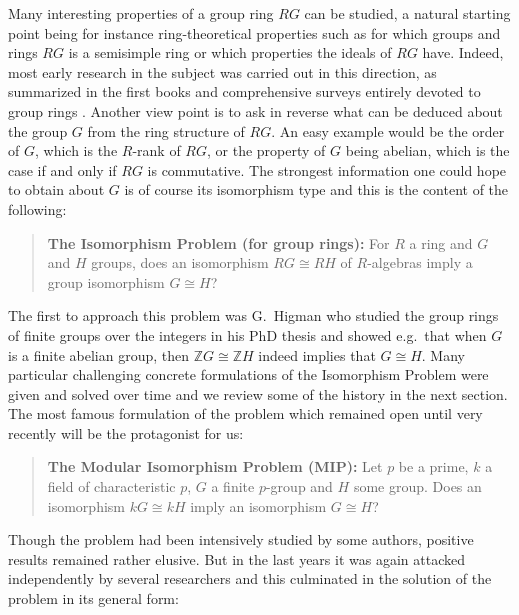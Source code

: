 \documentclass[11pt, a4paper]{amsart}
\theoremstyle{definition}
\begin{document}
Many interesting properties of a group ring $RG$ can be studied, a natural starting point being for instance ring-theoretical properties such as for which groups and rings $RG$ is a semisimple ring or which properties the ideals of $RG$ have. Indeed, most early research in the subject was carried out in this direction, as summarized in the first books and comprehensive surveys entirely devoted to group rings \cite{PassmanInfiniteGroupRings, ZalesskiiMihalev73, BovdiBook74, PassmanAlgebraicStructure}. Another view point is to ask in reverse what can be deduced about the group $G$ from the ring structure of $RG$. An easy example would be the order of $G$, which is the $R$-rank of $RG$, or the property of $G$ being abelian, which is the case if and only if $RG$ is commutative. The strongest information one could hope to obtain about $G$ is of course its isomorphism type and this is the content of the following:

\begin{quote}\textbf{The Isomorphism Problem (for group rings):} For $R$ a ring and $G$ and $H$ groups, does an isomorphism $RG \cong RH$ of $R$-algebras imply a group isomorphism $G \cong
H$?
\end{quote}

The first to approach this problem was G.~Higman who studied the group rings of finite groups over the integers in his PhD thesis \cite{Higman1940Thesis} and showed e.g.\ that when $G$ is a finite abelian group, then $\mathbb{Z}G \cong \mathbb{Z}H$ indeed implies that $G \cong H$. Many particular challenging concrete formulations of the Isomorphism Problem were given and solved over time and we review some of the history in the next section. The most famous formulation of the problem which remained open until very recently will be the protagonist for us:

\begin{quote}\textbf{The Modular Isomorphism Problem (MIP):} Let $p$ be a prime, $k$ a field of characteristic $p$, $G$ a finite $p$-group and $H$ some group. Does an isomorphism $kG \cong kH$ imply an isomorphism $G \cong H$? 
\end{quote}

Though the problem had been intensively studied by some authors, positive results remained rather elusive. 
But in the last years it was again attacked independently by several researchers \cite{BaginskiKurdics, Sakurai, MargolisMoede, MargolisStanojkovski21, BrochedelRio21, MargolisSakuraiStanojkovski21} and this culminated in the solution of the problem in its general form:
\end{document}
